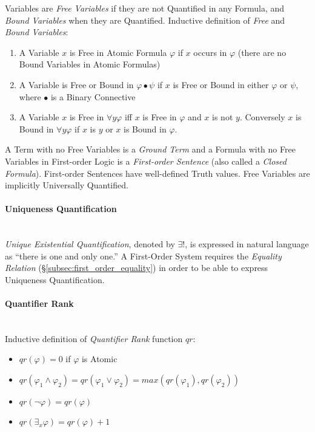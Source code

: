 \documentclass{article}
\begin{document}
Variables are \emph{Free Variables} if they are not Quantified in any
Formula, and \emph{Bound Variables} when they are Quantified.
Inductive definition of \emph{Free} and \emph{Bound Variables}:
\begin{enumerate}
\item A Variable $x$ is Free in Atomic Formula $\varphi$ if $x$ occurs
  in $\varphi$ (there are no Bound Variables in Atomic Formulas)
\item A Variable is Free or Bound in $\varphi \bullet \psi$ if $x$ is
  Free or Bound in either $\varphi$ or $\psi$, where $\bullet$ is a
  Binary Connective
\item A Variable $x$ is Free in $\forall y \varphi$ iff $x$ is Free in
  $\varphi$ and $x$ is not $y$. Conversely $x$ is Bound in $\forall y
  \varphi$ if $x$ is $y$ or $x$ is Bound in $\varphi$.
\end{enumerate}

A Term with no Free Variables is a \emph{Ground Term} and a Formula
with no Free Variables in First-order Logic is a \emph{First-order
  Sentence} (also called a \emph{Closed Formula}). First-order
Sentences have well-defined Truth values. Free Variables are
implicitly Universally Quantified.

\paragraph{Uniqueness Quantification}\hfill
\\
\emph{Unique Existential Quantification}, denoted by $\exists !$,
is expressed in natural language as ``there is one and only one.'' A
First-Order System requires the \emph{Equality Relation}
(\S\ref{subsec:first_order_equality}) in order to be able to express
Uniqueness Quantification.

\paragraph{Quantifier Rank}\hfill
\\
Inductive definition of \emph{Quantifier Rank} function $qr$:
\begin{itemize}
\item $qr(\varphi) = 0$ if $\varphi$ is Atomic
\item $qr(\varphi_1 \wedge \varphi_2) = qr(\varphi_1 \vee \varphi_2) = max(qr(\varphi_1),qr(\varphi_2))$
\item $qr(\neg \varphi) = qr(\varphi)$
\item $qr(\exists_x \varphi) = qr(\varphi) + 1$
\end{itemize}
\end{document}

